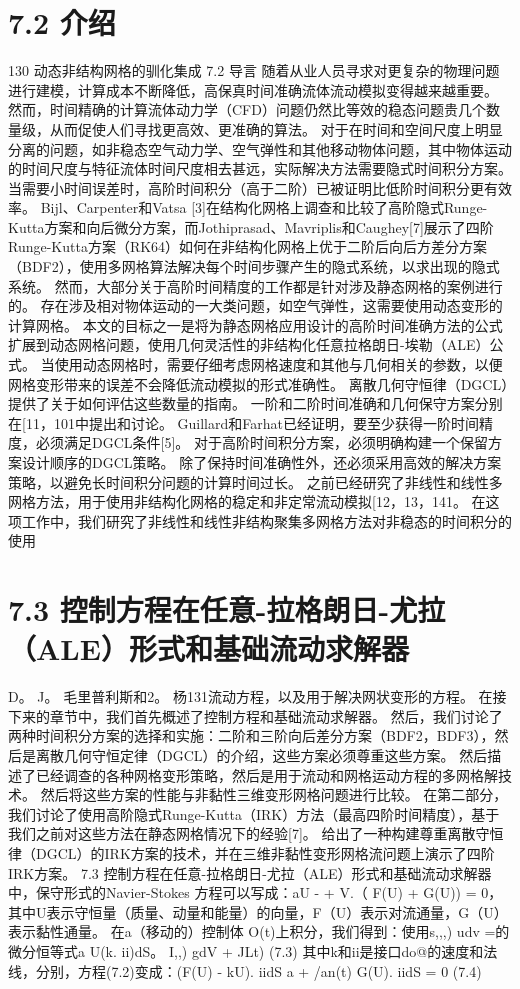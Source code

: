 \documentclass[UTF8,11pt,a4paper,openany,fontset=fandol]{ctexbook}
\begin{document}
\section{7.2 介绍}
130 动态非结构网格的驯化集成 7.2 导言 随着从业人员寻求对更复杂的物理问题进行建模，计算成本不断降低，高保真时间准确流体流动模拟变得越来越重要。 然而，时间精确的计算流体动力学（CFD）问题仍然比等效的稳态问题贵几个数量级，从而促使人们寻找更高效、更准确的算法。 对于在时间和空间尺度上明显分离的问题，如非稳态空气动力学、空气弹性和其他移动物体问题，其中物体运动的时间尺度与特征流体时间尺度相去甚远，实际解决方法需要隐式时间积分方案。 当需要小时间误差时，高阶时间积分（高于二阶）已被证明比低阶时间积分更有效率。 Bijl、Carpenter和Vatsa [3]在结构化网格上调查和比较了高阶隐式Runge-Kutta方案和向后微分方案，而Jothiprasad、Mavriplis和Caughey[7]展示了四阶Runge-Kutta方案（RK64）如何在非结构化网格上优于二阶后向后方差分方案（BDF2），使用多网格算法解决每个时间步骤产生的隐式系统，以求出现的隐式系统。 然而，大部分关于高阶时间精度的工作都是针对涉及静态网格的案例进行的。 存在涉及相对物体运动的一大类问题，如空气弹性，这需要使用动态变形的计算网格。 本文的目标之一是将为静态网格应用设计的高阶时间准确方法的公式扩展到动态网格问题，使用几何灵活性的非结构化任意拉格朗日-埃勒（ALE）公式。 当使用动态网格时，需要仔细考虑网格速度和其他与几何相关的参数，以便网格变形带来的误差不会降低流动模拟的形式准确性。 离散几何守恒律（DGCL）提供了关于如何评估这些数量的指南。 一阶和二阶时间准确和几何保守方案分别在[11，101中提出和讨论。 Guillard和Farhat已经证明，要至少获得一阶时间精度，必须满足DGCL条件[5]。 对于高阶时间积分方案，必须明确构建一个保留方案设计顺序的DGCL策略。 除了保持时间准确性外，还必须采用高效的解决方案策略，以避免长时间积分问题的计算时间过长。 之前已经研究了非线性和线性多网格方法，用于使用非结构化网格的稳定和非定常流动模拟[12，13，141。 在这项工作中，我们研究了非线性和线性非结构聚集多网格方法对非稳态的时间积分的使用

\section{7.3 控制方程在任意-拉格朗日-尤拉（ALE）形式和基础流动求解器}
D。 J。 毛里普利斯和2。 杨131流动方程，以及用于解决网状变形的方程。 在接下来的章节中，我们首先概述了控制方程和基础流动求解器。 然后，我们讨论了两种时间积分方案的选择和实施：二阶和三阶向后差分方案（BDF2，BDF3），然后是离散几何守恒定律（DGCL）的介绍，这些方案必须尊重这些方案。 然后描述了已经调查的各种网格变形策略，然后是用于流动和网格运动方程的多网格解技术。 然后将这些方案的性能与非黏性三维变形网格问题进行比较。 在第二部分，我们讨论了使用高阶隐式Runge-Kutta（IRK）方法（最高四阶时间精度），基于我们之前对这些方法在静态网格情况下的经验[7]。 给出了一种构建尊重离散守恒律（DGCL）的IRK方案的技术，并在三维非黏性变形网格流问题上演示了四阶IRK方案。 7.3 控制方程在任意-拉格朗日-尤拉（ALE）形式和基础流动求解器中，保守形式的Navier-Stokes 方程可以写成：aU - + V.（ F(U) + G(U)) = 0，其中U表示守恒量（质量、动量和能量）的向量，F（U）表示对流通量，G（U）表示黏性通量。 在a（移动的）控制体 O(t)上积分，我们得到：使用s,,,) udv =的微分恒等式a U(k. ii)dS。 I,,) gdV + JLt) (7.3) 其中k和ii是接口do@的速度和法线，分别，方程(7.2)变成：(F(U) - kU). iidS a + /an(t) G(U). iidS = 0 (7.4)
\end{document}
